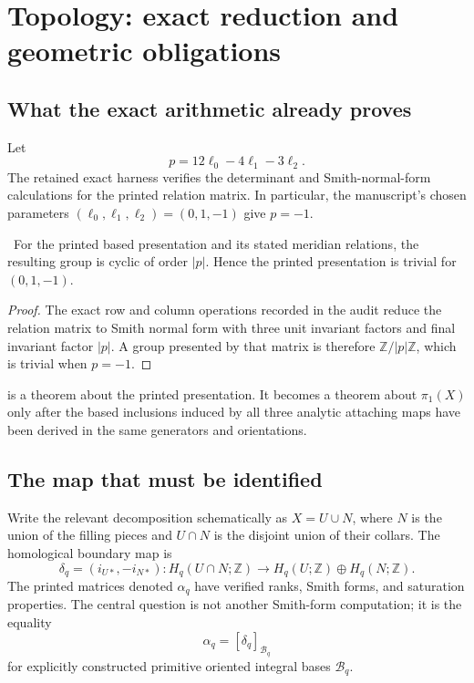 \section{Topology: exact reduction and geometric obligations}

\subsection{What the exact arithmetic already proves}

Let
\[
p=12\ell_0-4\ell_1-3\ell_2.
\]
The retained exact harness verifies the determinant and Smith-normal-form calculations for the printed relation matrix. In particular, the manuscript's chosen parameters $(\ell_0,\ell_1,\ell_2)=(0,1,-1)$ give $p=-1$.

\begin{proposition}\label{prop:terminal-group}
\Verified\ For the printed based presentation and its stated meridian relations, the resulting group is cyclic of order $|p|$. Hence the printed presentation is trivial for $(0,1,-1)$.
\end{proposition}

\begin{proof}
The exact row and column operations recorded in the audit reduce the relation matrix to Smith normal form with three unit invariant factors and final invariant factor $|p|$. A group presented by that matrix is therefore $\mathbb Z/|p|\mathbb Z$, which is trivial when $p=-1$.
\end{proof}

\begin{remark}
 is a theorem about the printed presentation. It becomes a theorem about $\pi_1(X)$ only after the based inclusions induced by all three analytic attaching maps have been derived in the same generators and orientations.
\end{remark}

\subsection{The map that must be identified}

Write the relevant decomposition schematically as $X=U\cup N$, where $N$ is the union of the filling pieces and $U\cap N$ is the disjoint union of their collars. The homological boundary map is
\[
\delta_q=(i_{U*},-i_{N*})\colon
H_q(U\cap N;\mathbb Z)\longrightarrow
H_q(U;\mathbb Z)\oplus H_q(N;\mathbb Z).
\]
The printed matrices denoted $\alpha_q$ have verified ranks, Smith forms, and saturation properties. The central question is not another Smith-form computation; it is the equality
\[
\boxed{\alpha_q=[\delta_q]_{\mathcal B_q}}
\]
for explicitly constructed primitive oriented integral bases $\mathcal B_q$.

